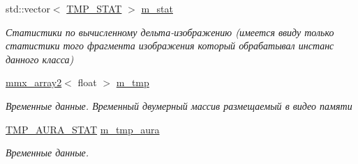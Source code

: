 \begin{DoxyCompactItemize}
\item 
std\+::vector$<$ \hyperlink{class_c_v_i_engine_thread_a963dcd94cfc9dd191a6c4dc50458797f}{T\+M\+P\+\_\+\+S\+T\+A\+T} $>$ \hyperlink{class_c_v_i_engine_thread_aa356e0ebc6490ee932679fb7ca5021b5}{m\+\_\+stat}
\begin{DoxyCompactList}\small\item\em Статистики по вычисленному дельта-\/изображению (имеется ввиду только статистики того фрагмента изображения который обрабатывал инстанс данного класса) \end{DoxyCompactList}\item 
\hyperlink{classmmx__array2}{mmx\+\_\+array2}$<$ float $>$ \hyperlink{class_c_v_i_engine_thread_af213b9d425f314412e3de05774960c3f}{m\+\_\+tmp}
\begin{DoxyCompactList}\small\item\em Временные данные. Временный двумерный массив размещаемый в видео памяти \end{DoxyCompactList}\item 
\hyperlink{struct_c_v_i_engine_thread_1_1tag_t_m_p___a_u_r_a___s_t_a_t}{T\+M\+P\+\_\+\+A\+U\+R\+A\+\_\+\+S\+T\+A\+T} \hyperlink{class_c_v_i_engine_thread_a6ffad2b9d46d3d237d194b7d07720f6b}{m\+\_\+tmp\+\_\+aura}
\begin{DoxyCompactList}\small\item\em Временные данные. \end{DoxyCompactList}\end{DoxyCompactItemize}
